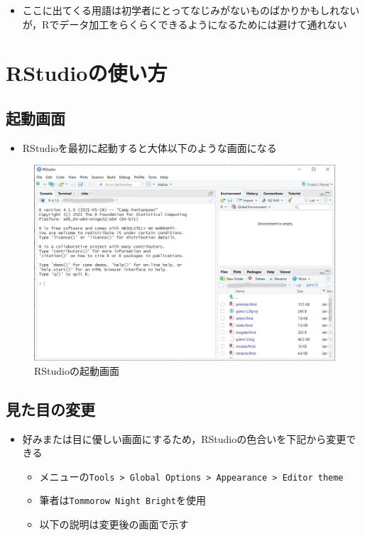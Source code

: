 \documentclass[
  xelatex,ja=standard, b5paper]{bxjsbook}
\providecommand{\tightlist}{%
  \setlength{\itemsep}{0pt}\setlength{\parskip}{0pt}}
\begin{document}
\begin{itemize}
\tightlist
\item
  ここに出てくる用語は初学者にとってなじみがないものばかりかもしれないが，Rでデータ加工をらくらくできるようになるためには避けて通れない
\end{itemize}

\hypertarget{rstudioux306eux4f7fux3044ux65b9}{%
\section{RStudioの使い方}\label{rstudioux306eux4f7fux3044ux65b9}}

\hypertarget{ux8d77ux52d5ux753bux9762}{%
\subsection{起動画面}\label{ux8d77ux52d5ux753bux9762}}

\begin{itemize}
\tightlist
\item
  RStudioを最初に起動すると大体以下のような画面になる
\end{itemize}

\begin{figure}

{\centering \includegraphics[width=0.8\linewidth]{images/start} 

}

\caption{RStudioの起動画面}\label{fig:start}
\end{figure}

\hypertarget{ux898bux305fux76eeux306eux5909ux66f4}{%
\subsection{見た目の変更}\label{ux898bux305fux76eeux306eux5909ux66f4}}

\begin{itemize}
\tightlist
\item
  好みまたは目に優しい画面にするため，RStudioの色合いを下記から変更できる

  \begin{itemize}
  \tightlist
  \item
    メニューの\texttt{Tools\ \textgreater{}\ Global\ Options\ \textgreater{}\ Appearance\ \textgreater{}\ Editor\ theme}
  \item
    筆者は\texttt{Tommorow\ Night\ Bright}を使用
  \item
    以下の説明は変更後の画面で示す
  \end{itemize}
\end{itemize}
\end{document}
